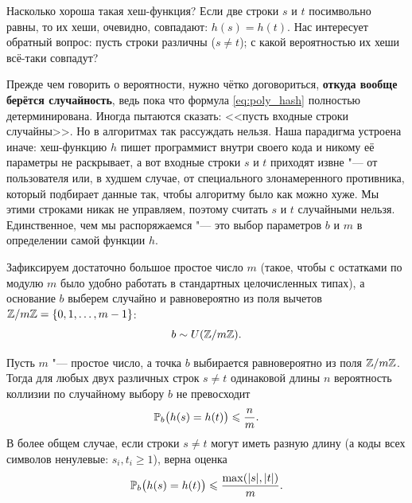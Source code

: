 Насколько хороша такая хеш-функция? Если две строки $s$ и $t$ посимвольно равны, то их хеши, очевидно, совпадают: $h(s) = h(t)$. Нас интересует обратный вопрос: пусть строки различны ($s \ne t$); с какой вероятностью их хеши всё-таки совпадут?

Прежде чем говорить о вероятности, нужно чётко договориться, \textbf{откуда вообще берётся случайность}, ведь пока что формула \eqref{eq:poly_hash} полностью детерминирована. Иногда пытаются сказать: <<пусть входные строки случайны>>. Но в алгоритмах так рассуждать нельзя. Наша парадигма устроена иначе: хеш-функцию $h$ пишет программист внутри своего кода и никому её параметры не раскрывает, а вот входные строки $s$ и $t$ приходят извне "--- от пользователя или, в худшем случае, от специального злонамеренного противника, который подбирает данные так, чтобы алгоритму было как можно хуже. Мы этими строками никак не управляем, поэтому считать $s$ и $t$ случайными нельзя. Единственное, чем мы распоряжаемся "--- это выбор параметров $b$ и $m$ в определении самой функции $h$.

Зафиксируем достаточно большое простое число $m$ (такое, чтобы с остатками по модулю $m$ было удобно работать в стандартных целочисленных типах), а основание $b$ выберем случайно и равновероятно из поля вычетов $\mathbb{Z} / m\mathbb{Z} = \{0, 1, \dots, m - 1\}$:
\[
    b \sim U(\mathbb{Z} / m\mathbb{Z}).
\]

\begin{proposition}
    Пусть $m$ "--- простое число, а точка $b$ выбирается равновероятно из поля $\mathbb{Z} / m\mathbb{Z}$. Тогда для любых двух различных строк $s \ne t$ одинаковой длины $n$ вероятность коллизии по случайному выбору $b$ не превосходит
    \[
        \mathbb{P}_b\bigl(h(s) = h(t)\bigr) \leqslant \frac{n}{m}.
    \]
    В более общем случае, если строки $s \ne t$ могут иметь разную длину (а коды всех символов ненулевые: $s_i, t_i \ge 1$), верна оценка
    \[
        \mathbb{P}_b\bigl(h(s) = h(t)\bigr) \leqslant \frac{\max(|s|, |t|)}{m}.
    \]
\end{proposition}

